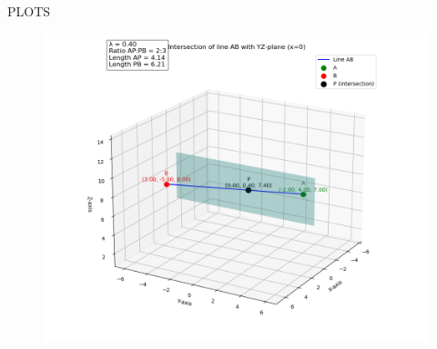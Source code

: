 \documentclass{beamer}
\begin{document}
\begin{frame}[fragile]{PLOTS}
\begin{figure}
    \centering
    \includegraphics[width=0.9\columnwidth]{figs/Fig -62.png}
    \caption{}
    \label{fig:placeholder}
\end{figure}
\end{frame}
\end{document}
